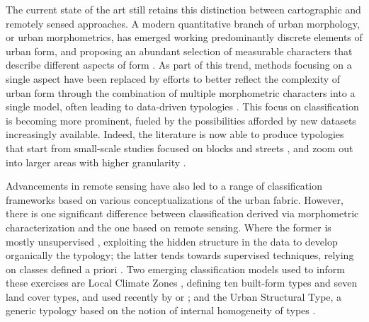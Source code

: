 The current state of the art still retains this distinction between
cartographic and remotely sensed approaches. A modern quantitative branch of urban morphology,
or urban morphometrics, has emerged working predominantly discrete elements of
urban form, and proposing an abundant selection of
measurable characters that describe different aspects of form
\citep{fleischmann2020measuring}. As part of this trend, methods focusing on a single aspect
\citep{porta2006} have been replaced by efforts to better reflect the
complexity of urban form through the combination of multiple morphometric characters into a
single model, often leading to data-driven typologies \citep{song2007}.
This focus on classification is becoming more prominent, fueled by the
possibilities afforded by new datasets increasingly available. Indeed, the
literature is now able to produce typologies that start
from small-scale studies focused on blocks and streets \citep{gil2012}, and
zoom out into larger areas with higher granularity \citep{schirmer2015, araldi2019,
bobkova2019, dibble2019origin, jochem2020}.

Advancements in remote sensing have also led to a range of classification
frameworks based on various conceptualizations of the urban fabric. However,
there is one significant difference between classification derived via
morphometric characterization and the one based on remote sensing. Where the
former is mostly unsupervised \citep{araldi2019, schirmer2015}, exploiting the
hidden structure in the data to develop organically the typology; the latter
tends towards supervised techniques, relying on classes defined a priori
\citep{ pauleit2000assessing}. Two emerging classification
models used to inform these exercises are Local Climate Zones
\citep{stewart2012}, defining ten built-form types and seven land cover types,
and used recently by \cite{koc2017mapping} or \cite{taubenbock2020}; and the Urban Structural
Type, a generic typology based on the notion of internal homogeneity of types
\citep{lehner2019}. 



